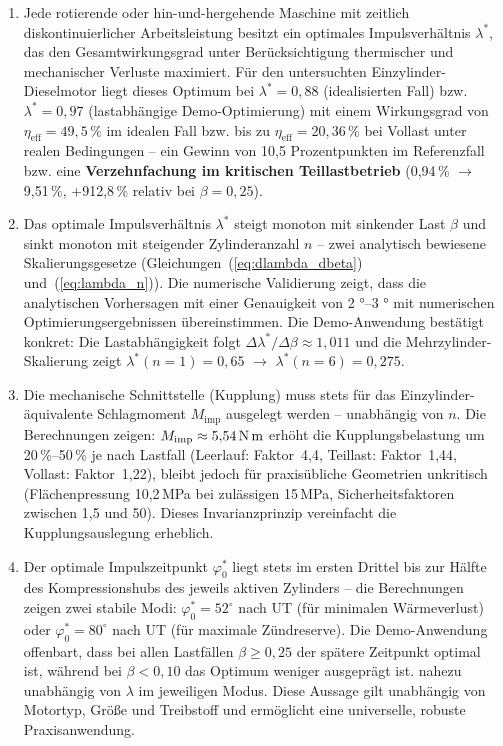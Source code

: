 ﻿\documentclass[a4paper,12pt]{article}
\begin{document}
\begin{enumerate}
	\item Jede rotierende oder hin-und-hergehende Maschine mit
	zeitlich diskontinuierlicher Arbeitsleistung besitzt ein
	optimales Impulsverhältnis $\lambda^*$, das den Gesamtwirkungsgrad
	unter Berücksichtigung thermischer und mechanischer Verluste maximiert.
	Für den untersuchten Einzylinder-Dieselmotor liegt dieses Optimum bei
	$\lambda^* = 0{,}88$ (idealisierten Fall) bzw. $\lambda^* = 0{,}97$
	(lastabhängige Demo-Optimierung) mit einem Wirkungsgrad von
	$\eta_\text{eff} = 49{,}5\,\%$ im idealen Fall bzw. bis zu
	$\eta_\text{eff} = 20{,}36\,\%$ bei Vollast unter realen Bedingungen
	-- ein Gewinn von 10{,}5 Prozentpunkten im Referenzfall bzw. eine
	\textbf{Verzehnfachung im kritischen Teillastbetrieb} (0{,}94\,\%
	$\rightarrow$ 9{,}51\,\%, +912{,}8\,\% relativ bei $\beta = 0{,}25$).

	\item Das optimale Impulsverhältnis $\lambda^*$ steigt monoton
	mit sinkender Last $\beta$ und sinkt monoton mit steigender
	Zylinderanzahl $n$ -- zwei analytisch bewiesene
	Skalierungsgesetze (Gleichungen~(\ref{eq:dlambda_dbeta})
	und~(\ref{eq:lambda_n})). Die numerische Validierung zeigt,
	dass die analytischen Vorhersagen mit einer Genauigkeit von
	2 °--3 ° mit numerischen Optimierungsergebnissen übereinstimmen.
	Die Demo-Anwendung bestätigt konkret: Die Lastabhängigkeit folgt
	$\Delta\lambda^*/\Delta\beta \approx 1{,}011$ und die Mehrzylinder-Skalierung
	zeigt $\lambda^*(n=1) = 0{,}65$ $\rightarrow$ $\lambda^*(n=6) = 0{,}275$.

	\item Die mechanische Schnittstelle (Kupplung) muss stets für
	das Einzylinder-äquivalente Schlagmoment $M_\text{imp}$
	ausgelegt werden -- unabhängig von $n$. Die Berechnungen zeigen:
	$M_\text{imp} \approx 5{,}54\,\text{N\,m}$ erhöht die Kupplungsbelastung
	um 20\,\%--50\,\% je nach Lastfall (Leerlauf: Faktor~4{,}4, Teillast:
	Faktor~1{,}44, Vollast: Faktor~1{,}22), bleibt jedoch für praxisübliche
	Geometrien unkritisch (Flächenpressung 10{,}2\,MPa bei zulässigen 15\,MPa,
	Sicherheitsfaktoren zwischen 1{,}5 und 50). Dieses Invarianzprinzip
	vereinfacht die Kupplungsauslegung erheblich.

	\item Der optimale Impulszeitpunkt $\varphi_0^*$ liegt stets
	im ersten Drittel bis zur Hälfte des Kompressionshubs des jeweils aktiven
	Zylinders -- die Berechnungen zeigen zwei stabile Modi:
	$\varphi_0^* = 52^\circ$ nach UT (für minimalen Wärmeverlust) oder
	$\varphi_0^* = 80^\circ$ nach UT (für maximale Zündreserve).
	Die Demo-Anwendung offenbart, dass bei allen Lastfällen $\beta \geq 0{,}25$
	der spätere Zeitpunkt optimal ist, während bei $\beta < 0{,}10$ das Optimum
	weniger ausgeprägt ist.
	nahezu unabhängig von $\lambda$ im jeweiligen Modus. Diese Aussage gilt
	unabhängig von Motortyp, Größe und Treibstoff und ermöglicht eine
	universelle, robuste Praxisanwendung.


\end{enumerate}
\end{document}
